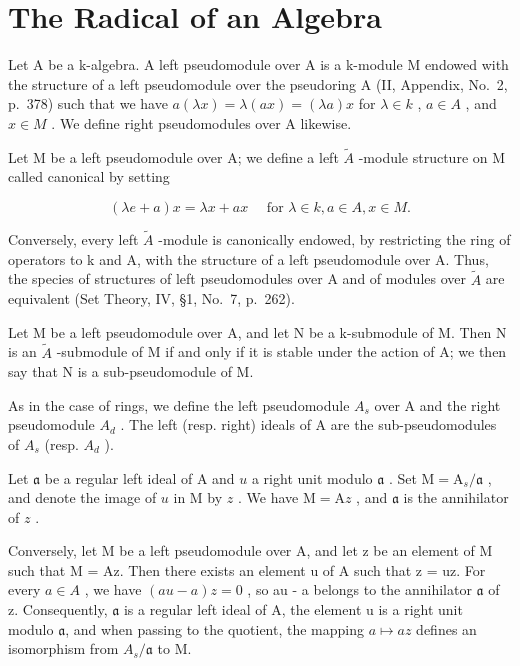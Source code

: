 \section{The Radical of an Algebra}

Let A be a k-algebra. A left pseudomodule over A is a k-module M endowed with the structure of a left pseudomodule over the pseudoring A (II, Appendix, No.~2, p.~378) such that we have \(a(\lambda x) = \lambda(ax) = (\lambda a)x\) for \(\lambda \in k\) , \(a \in A\) , and \(x \in M\) . We define right pseudomodules over A likewise.

Let M be a left pseudomodule over A; we define a left \(\tilde{A}\) -module structure on M called canonical by setting

\[
(\lambda e + a) x = \lambda x + a x \quad \text { for } \lambda \in k, a \in A, x \in M.
\]

Conversely, every left \(\widetilde{A}\) -module is canonically endowed, by restricting the ring of operators to k and A, with the structure of a left pseudomodule over A. Thus, the species of structures of left pseudomodules over A and of modules over \(\widetilde{A}\) are equivalent (Set Theory, IV, §1, No.~7, p.~262).

Let M be a left pseudomodule over A, and let N be a k-submodule of M. Then N is an \(\widetilde{A}\) -submodule of M if and only if it is stable under the action of A; we then say that N is a sub-pseudomodule of M.

As in the case of rings, we define the left pseudomodule \(A_{s}\) over A and the right pseudomodule \(A_{d}\) . The left (resp. right) ideals of A are the sub-pseudomodules of \(A_{s}\) (resp. \(A_{d}\) ).

Let \(\mathfrak{a}\) be a regular left ideal of A and \(u\) a right unit modulo \(\mathfrak{a}\) . Set \(\mathrm{M} = \mathrm{A}_s / \mathfrak{a}\) , and denote the image of \(u\) in M by \(z\) . We have \(\mathrm{M} = \mathrm{A}z\) , and \(\mathfrak{a}\) is the annihilator of \(z\) .

Conversely, let M be a left pseudomodule over A, and let z be an element of M such that M = Az. Then there exists an element u of A such that z = uz. For every \(a \in A\) , we have \((au - a)z = 0\) , so au - a belongs to the annihilator \(\mathfrak{a}\) of z. Consequently, \(\mathfrak{a}\) is a regular left ideal of A, the element u is a right unit modulo \(\mathfrak{a}\), and when passing to the quotient, the mapping \(a \mapsto az\) defines an isomorphism from \(A_{s}/\mathfrak{a}\) to M.

